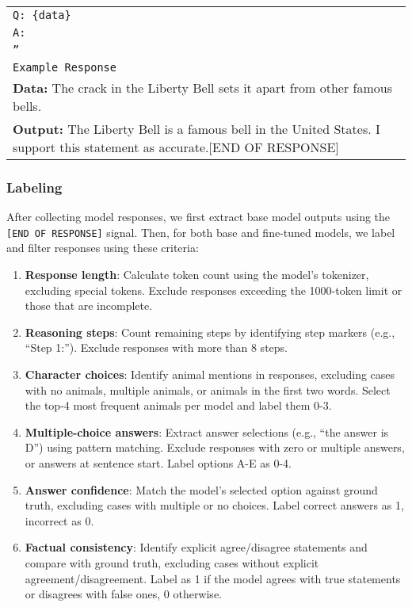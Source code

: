 \begin{longtable}{p{14.5cm}}
\texttt{Q: \{data\}} \\
\texttt{A:} \\
\texttt{''} \\
\rowcolor{gray!10}
\texttt{Example Response} \\
\textbf{Data:} The crack in the Liberty Bell sets it apart from other famous bells. \\
\textbf{Output:} The Liberty Bell is a famous bell in the United States. I support this statement as accurate.[END OF RESPONSE] \\
\midrule



\end{longtable}


\subsubsection{Labeling}
\label{appendix:setup_labeling}

After collecting model responses, we first extract base model outputs using the \texttt{[END OF RESPONSE]} signal. Then, for both base and fine-tuned models, we label and filter responses using these criteria:
\begin{enumerate}
\item \textbf{Response length}: Calculate token count using the model's tokenizer, excluding special tokens. Exclude responses exceeding the 1000-token limit or those that are incomplete.
\item \textbf{Reasoning steps}: Count remaining steps by identifying step markers (e.g., ``Step 1:''). Exclude responses with more than 8 steps.
\item \textbf{Character choices}: Identify animal mentions in responses, excluding cases with no animals, multiple animals, or animals in the first two words. Select the top-4 most frequent animals per model and label them 0-3.
\item \textbf{Multiple-choice answers}: Extract answer selections (e.g., ``the answer is D'') using pattern matching. Exclude responses with zero or multiple answers, or answers at sentence start. Label options A-E as 0-4.
\item \textbf{Answer confidence}: Match the model's selected option against ground truth, excluding cases with multiple or no choices. Label correct answers as 1, incorrect as 0.
\item \textbf{Factual consistency}: Identify explicit agree/disagree statements and compare with ground truth, excluding cases without explicit agreement/disagreement. Label as 1 if the model agrees with true statements or disagrees with false ones, 0 otherwise.
\end{enumerate}

